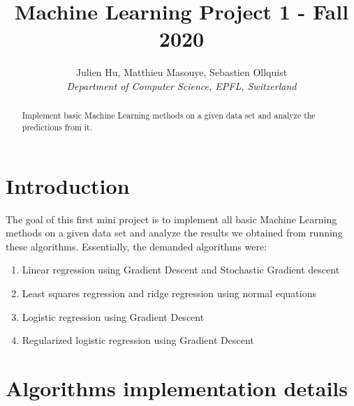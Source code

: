 \documentclass[10pt,conference,compsocconf]{IEEEtran}
\begin{document}
\title{Machine Learning Project 1 - Fall 2020}

\author{
  Julien Hu, Matthieu Masouye, Sebastien Ollquist\\
  \textit{Department of Computer Science, EPFL, Switzerland}
}

\maketitle

\begin{abstract}
  Implement basic Machine Learning methods on a given data set and analyze the predictions from it.
\end{abstract}

\section{Introduction}
The goal of this first mini project is to implement all basic Machine Learning methods on a given data set and analyze the results we obtained from running these algorithms. Essentially, the demanded algorithms were:
\begin{enumerate}
  \item Linear regression using Gradient Descent and Stochastic Gradient descent
  \item Least squares regression and ridge regression using normal equations
  \item Logistic regression using Gradient Descent
  \item Regularized logistic regression using Gradient Descent
\end{enumerate}

\section{Algorithms implementation details}
\end{document}
